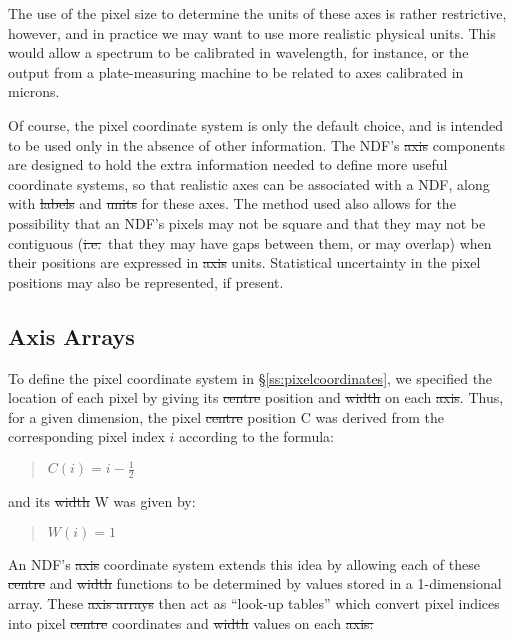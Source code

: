 The use of the pixel size to determine the units of these axes is rather
restrictive, however, and in practice we may want to use more realistic
physical units. 
This would allow a spectrum to be calibrated in wavelength, for instance, or
the output from a plate-measuring machine to be related to axes calibrated
in microns. 

Of course, the pixel coordinate system is only the default choice, and is 
intended to be used only in the absence of other information.
The NDF's \st{axis\/} components are designed to hold the extra information
needed to define more useful coordinate systems, so that realistic axes can
be associated with a NDF, along with \st{labels\/} and \st{units\/} for
these axes. 
The method used also allows for the possibility that an NDF's pixels may not
be square and that they may not be contiguous (\st{i.e.}\ that they may
have gaps between them, or may overlap) when their positions are expressed
in \st{axis\/} units. 
Statistical uncertainty in the pixel positions may also be represented, if 
present.

\subsection{\label{ss:axisarrays}Axis Arrays}

To define the pixel coordinate system in \S\ref{ss:pixelcoordinates}, we
specified the location of each pixel by giving its \st{centre\/} position
and \st{width\/} on each \st{axis}. 
Thus, for a given dimension, the pixel \st{centre\/} position C was derived
from the corresponding pixel index $i$ according to the formula: 

\small
\begin{quote}
\begin{center}
$C(i)=i-\frac{1}{2}$
\end{center}
\end{quote}
\normalsize

and its \st{width\/} W was given by:

\small
\begin{quote}
\begin{center}
$W(i)=1$
\end{center}
\end{quote}
\normalsize

An NDF's \st{axis\/} coordinate system extends this idea by allowing each
of these \st{centre\/} and \st{width\/} functions to be determined by
values stored in a 1-dimensional array. 
These \st{axis arrays\/} then act as ``look-up tables'' which convert pixel
indices into pixel \st{centre\/} coordinates and \st{width\/} values on 
each \st{axis:}

